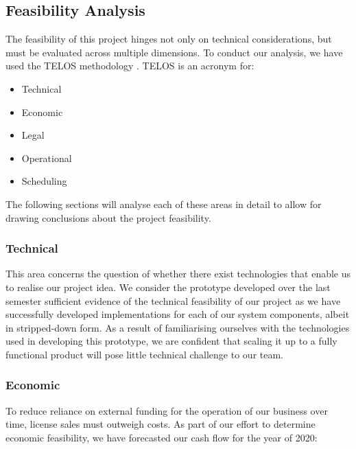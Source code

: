 \documentclass[main.tex]{subfiles}
\begin{document}
\subsection{Feasibility Analysis}
\label{Feasibility Analysis}

The feasibility of this project hinges not only on technical considerations, but must be evaluated across multiple dimensions. To conduct our analysis, we have used the TELOS methodology \cite{drljaca_latinovic_2018}. TELOS is an acronym for:

\begin{itemize}
    \item Technical
    \item Economic
    \item Legal
    \item Operational
    \item Scheduling
\end{itemize}

The following sections will analyse each of these areas in detail to allow for drawing conclusions about the project feasibility.

\subsubsection{Technical}

This area concerns the question of whether there exist technologies that enable us to realise our project idea. We consider the prototype developed over the last semester sufficient evidence of the technical feasibility of our project as we have successfully developed implementations for each of our system components, albeit in stripped-down form. As a result of familiarising ourselves with the technologies used in developing this prototype, we are confident that scaling it up to a fully functional product will pose little technical challenge to our team.

\subsubsection{Economic}

To reduce reliance on external funding for the operation of our business over time, license sales must outweigh costs. As part of our effort to determine economic feasibility, we have forecasted our cash flow for the year of 2020:
\end{document}
